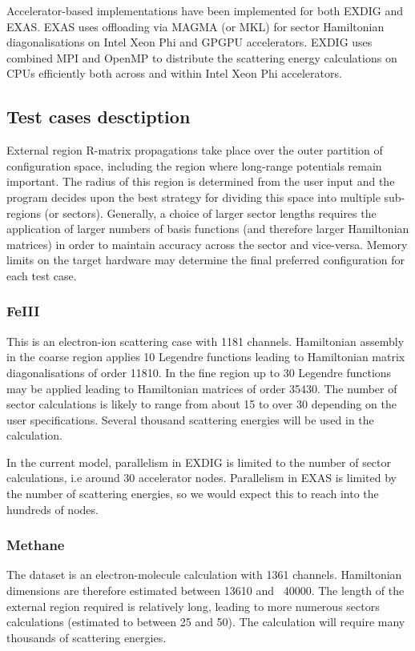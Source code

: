Accelerator-based implementations have been implemented for both EXDIG and EXAS. EXAS uses offloading via MAGMA (or MKL) for sector Hamiltonian diagonalisations on Intel Xeon Phi and GPGPU accelerators. EXDIG uses combined MPI and OpenMP to distribute the scattering energy calculations on CPUs efficiently both across and within Intel Xeon Phi accelerators.

\subsection{Test cases desctiption}
External region R-matrix propagations take place over the outer partition of configuration space, including the region where long-range potentials remain important. The radius of this region is determined from the user input and the program decides upon the best strategy for dividing this space into multiple sub-regions (or sectors). Generally, a choice of larger sector lengths requires the application of larger numbers of basis functions (and therefore larger Hamiltonian matrices) in order to maintain accuracy across the sector and vice-versa. Memory limits on the target hardware may determine the final preferred configuration for each test case.

\subsubsection{FeIII}
This is an electron-ion scattering case with 1181 channels. Hamiltonian assembly in the coarse region applies 10 Legendre functions leading to Hamiltonian matrix diagonalisations of order 11810. In the fine region up to 30 Legendre functions may be applied leading to Hamiltonian matrices of order 35430. The number of sector calculations is likely to range from about 15 to over 30 depending on the user specifications. Several thousand scattering energies will be used in the calculation.

In the current model, parallelism in EXDIG is limited to the number of sector calculations, i.e around 30 accelerator nodes. Parallelism in EXAS is limited by the number of scattering energies, so we would expect this to reach into the hundreds of nodes.

\subsubsection{Methane}
The dataset is an electron-molecule calculation with 1361 channels. Hamiltonian dimensions are therefore estimated between 13610 and ~40000. The length of the external region required is relatively long, leading to more numerous sectors calculations (estimated to between 25 and 50). The calculation will require many thousands of scattering energies.

